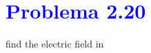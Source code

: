 \documentclass[12pt]{article}
\newcommand{\question}[1]{\textcolor{blue}{\textbf{#1}}}
\begin{document}

\section*{\question{ Problema 2.20}} find the electric field in

\end{document}
